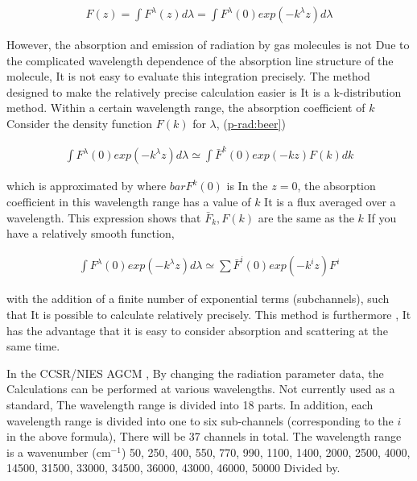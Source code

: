 \begin{eqnarray}
  F(z) = \int F^\lambda(z) d \lambda 
 = \int F^\lambda(0) exp (-k^\lambda z) d \lambda
\end{eqnarray}

\begin{quote}
\protect\hypertarget{p-rad:beer}{}{}
\end{quote}

However, the absorption and emission of radiation by gas molecules is
not Due to the complicated wavelength dependence of the absorption line
structure of the molecule, It is not easy to evaluate this integration
precisely. The method designed to make the relatively precise
calculation easier is It is a k-distribution method. Within a certain
wavelength range, the absorption coefficient of \(k\) Consider the
density function \(F(k)\) for \(\lambda\),
(\protect\hyperlink{p-rad:beer}{p-rad:beer{]}})

\begin{eqnarray}
 \int F^\lambda(0) exp (-k^\lambda z) d \lambda 
 \simeq \int \bar{F}^k(0) exp (-k z) F(k) dk
\end{eqnarray}

which is approximated by where \(bar{F}^k(0)\) is In the \(z=0\), the
absorption coefficient in this wavelength range has a value of \(k\) It
is a flux averaged over a wavelength. This expression shows that
\(\bar{F}_k, F(k)\) are the same as the \(k\) If you have a relatively
smooth function,

\begin{eqnarray}
 \int F^\lambda(0) exp (-k^\lambda z) d \lambda 
 \simeq \sum \bar{F}^i(0) exp (-k^i z) F^i
\end{eqnarray}

\begin{quote}
\protect\hypertarget{p-rad:beer-kd}{}{ }
\end{quote}

with the addition of a finite number of exponential terms (subchannels),
such that It is possible to calculate relatively precisely. This method
is furthermore , It has the advantage that it is easy to consider
absorption and scattering at the same time.

In the CCSR/NIES AGCM , By changing the radiation parameter data, the
Calculations can be performed at various wavelengths. Not currently used
as a standard, The wavelength range is divided into 18 parts. In
addition, each wavelength range is divided into one to six sub-channels
(corresponding to the \(i\) in the above formula), There will be 37
channels in total. The wavelength range is a wavenumber (cm\(^{-1}\))
50, 250, 400, 550, 770, 990, 1100, 1400, 2000, 2500, 4000, 14500, 31500,
33000, 34500, 36000, 43000, 46000, 50000 Divided by.


